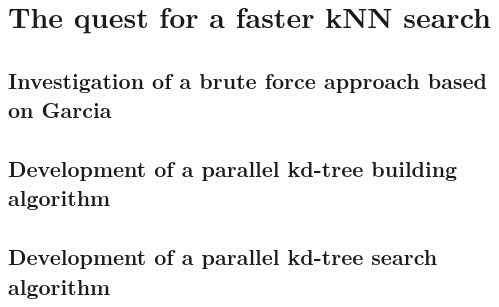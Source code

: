 
\section{The quest for a faster kNN search} %
\label{sec:the_quest_for_a_faster_knn_search}

\subsection{Investigation of a brute force approach based on Garcia} %
\label{sub:investigation_of_a_brute_force_approach_based_on_garcia}


\subsection{Development of a parallel kd-tree building algorithm} %
\label{sub:development_of_a_parallel_kd_tree_building_algorithm}


\subsection{Development of a parallel kd-tree search algorithm} %
\label{sub:development_of_a_parallel_kd_tree_search_algorithm}



